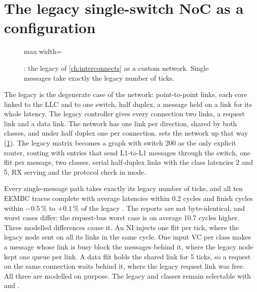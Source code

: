 \section{The legacy single-switch NoC as a configuration}\label{sec:noc-legacy}

\begin{figure}[htbp]\centering
\begin{adjustbox}{max width=\textwidth}\end{adjustbox}
\caption{: the legacy  of \cref{ch:interconnects} as a
custom network. Single messages take exactly the legacy number of ticks.}
\label{fig:noc-legacy}
\end{figure}

The legacy  is the degenerate case of the network: point-to-point links, each core
linked to the LLC and to one switch, half duplex, a message held on a link for its whole latency.
The legacy controller gives every connection two links, a request link and a data link. The network
has one link per direction, shared by both classes, and under half duplex one per connection.  sets the network up that way
(\cref{fig:noc-legacy}). The legacy matrix becomes a  graph with switch 200 as the
only explicit router,  routing with  entries that send L1-to-L1
messages through the switch, one flit per message, two classes, serial half-duplex
links with the class latencies 2 and 5,  RX serving and the protocol check in
 mode.

Every single-message path takes exactly its legacy number of ticks, and all ten EEMBC traces
complete with average latencies within 0.2 cycles and finish cycles within $-0.5\,\%$ to
$+0.1\,\%$ of the legacy . The reports are not byte-identical, and worst cases differ:
the request-bus worst case is on average 10.7 cycles higher. Three modelled differences cause
it. An NI injects one flit per tick, where the legacy node sent on all its links in the same cycle.
One input VC per class makes a message whose link is busy block the messages behind it, where the
legacy node kept one queue per link. A data flit holds the shared link for 5 ticks, so a request
on the same connection waits behind it, where the legacy request link was free. All three are
modelled on purpose. The legacy
 and  classes remain selectable with  and
.

